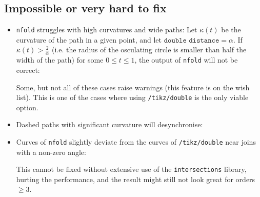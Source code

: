 \documentclass[12pt,a4paper]{article}
\theoremstyle{definition}
\newcommand{\tikzdouble}{\texttt{/tikz/double}}
\newcommand{\nfold}{\texttt{nfold}}
\begin{document}
\subsection{Impossible or very hard to fix}
\begin{itemize}
  \item \nfold{} struggles with high curvatures and wide paths: Let $\kappa(t)$ be the curvature of the path in a given point, and let $\texttt{double distance} = \alpha$. If $\kappa(t) > \frac{2}{\alpha}$ (i.e. the radius of the osculating circle is smaller than half the width of the path) for some $0 \leq t \leq 1$, the output of \nfold{} will not be correct:
\begin{tkzexample}[latex=4.25cm]
\end{tkzexample}
  Some, but not all of these cases raise warnings (this feature is on the wish list). This is one of the cases where using \tikzdouble{} is the only viable option.
  \item Dashed paths with significant curvature will desynchronise:
\begin{tkzexample}[latex=3cm]
\end{tkzexample}
  \item Curves of \nfold{} slightly deviate from the curves of \tikzdouble{} near joins with a non-zero angle:
\begin{tkzexample}[latex=3.5cm]
\end{tkzexample}
  This cannot be fixed without extensive use of the \texttt{intersections} library, hurting the performance, and the result might still not look great for orders $\geq 3$.

\end{itemize}
\end{document}
